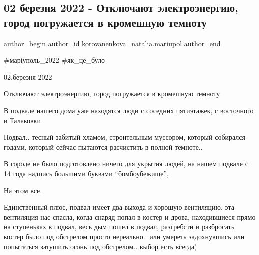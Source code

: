 
 
 
 
 

\subsection{02 березня 2022 - Отключают электроэнергию, город погружается в кромешную темноту}
\label{sec:02_03_2023.fb.korovanenkova_natalia.mariupol.1.02_bereznya_2022___o}

\ifcmt
 author_begin
   author_id korovanenkova_natalia.mariupol
 author_end
\fi

\#маріуполь\_2022 \#як\_це\_було

02.березня 2022

Отключают электроэнергию, город погружается в кромешную темноту

В подвале нашего дома уже находятся люди с соседних пятиэтажек, с восточного и
Талаковки

Подвал.. тесный забитый хламом, строительным муссором, который собирался
годами, который сейчас пытаются расчистить в полной темноте..

В городе не было подготовлено ничего для укрытия людей, на нашем подвале с 14
года надпись большими буквами \enquote{бомбоубежище},

На этом все.


Единственный плюс, подвал имеет два выхода и хорошую вентиляцию, эта
вентиляция нас спасла, когда снаряд попал в костер и дрова, находившиеся
прямо на ступеньках в подвал, весь дым пошел в подвал, разгребсти и
разбросать костер было под обстрелом просто нереально.. или умереть задохнувшись
или попытаться затушить огонь под обстрелом.. выбор есть всегда)

